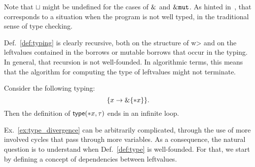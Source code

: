 \noindent
Note that $\sqcup$ might be undefined for the cases of $\&$
and $\&\mathtt{mut}$.
As hinted in~\cite{Pearce21}, that corresponds to a situation when the program
is not well typed, in the traditional sense of type checking.

Def.~\ref{def:typing} is clearly recursive, both on the structure of \<w> and
on the leftvalues contained in the borrows or mutable borrows that occur in the typing.
In general, that recursion is not well-founded. In algorithmic terms, this means
that the algorithm for computing the type of leftvalues might not terminate.

\begin{example}\label{ex:type_divergence}
  Consider the following typing:
  \[
  \{x\to\&\{\mathtt{*}x\}\}.
  \]
  Then the definition of $\mathsf{type}(\mathtt{*}x,\tau)$ ends in an infinite loop.
\end{example}

\noindent
Ex.~\ref{ex:type_divergence} can be arbitrarily complicated, through the
use of more involved cycles that pass through more variables. As a consequence,
the natural question is to understand when Def.~\ref{def:type} is well-founded.
For that, we start by defining a concept of dependencies between leftvalues.
